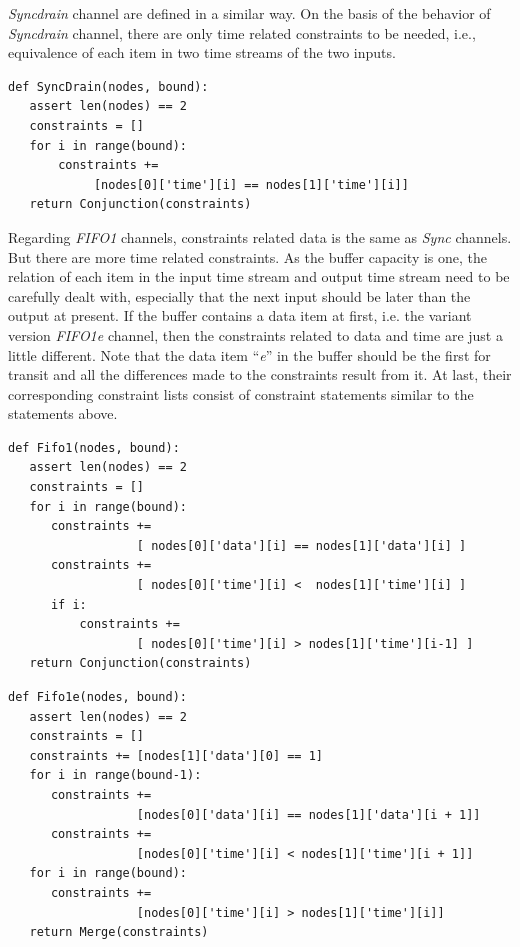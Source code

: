 \documentclass[3p,times]{elsarticle}
\begin{document}
\emph{Syncdrain} channel are defined in a similar way. On the basis of the behavior of \emph{Syncdrain} channel, there are only time related constraints to be needed, i.e., equivalence of each item in two time streams of the two inputs.
\begin{lstlisting}[frame=single]
def SyncDrain(nodes, bound):
   assert len(nodes) == 2
   constraints = []
   for i in range(bound):
       constraints +=
            [nodes[0]['time'][i] == nodes[1]['time'][i]]
   return Conjunction(constraints)
\end{lstlisting}
Regarding \emph{FIFO1} channels, constraints related data is the same as \emph{Sync} channels. But there are more time related constraints. As the buffer capacity is one, the relation of each item in the input time stream and output time stream need to be carefully dealt with, especially that the next input should be later than the output at present. If the buffer contains a data item at first, i.e. the variant version \emph{FIFO1e} channel, then the constraints related to data and time are just a little different. Note that the data item ``\emph{e}'' in the buffer should be the first for transit and all the differences made to the constraints result from it. At last, their corresponding constraint lists consist of constraint statements similar to the statements above.
\begin{lstlisting}[frame=single]
def Fifo1(nodes, bound):
   assert len(nodes) == 2
   constraints = []
   for i in range(bound):
      constraints +=
                  [ nodes[0]['data'][i] == nodes[1]['data'][i] ]
      constraints +=
                  [ nodes[0]['time'][i] <  nodes[1]['time'][i] ]
      if i:
          constraints +=
                  [ nodes[0]['time'][i] > nodes[1]['time'][i-1] ]
   return Conjunction(constraints)
\end{lstlisting}
\begin{lstlisting}[frame=single]
def Fifo1e(nodes, bound):
   assert len(nodes) == 2
   constraints = []
   constraints += [nodes[1]['data'][0] == 1]
   for i in range(bound-1):
      constraints +=
                  [nodes[0]['data'][i] == nodes[1]['data'][i + 1]]
      constraints +=
                  [nodes[0]['time'][i] < nodes[1]['time'][i + 1]]
   for i in range(bound):
      constraints +=
                  [nodes[0]['time'][i] > nodes[1]['time'][i]]
   return Merge(constraints)
\end{lstlisting}
\end{document}
